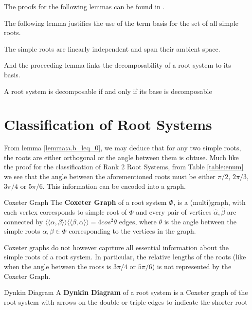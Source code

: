 The proofs for the following lemmas can be found in \cite{humphreys_1972_Weyl}.

The following lemma justifies the use of the term basis for the set of all simple roots.
\begin{lemma}
    \label{lemma:admit_config}
    The simple roots are linearly independent and span their ambient space.
\end{lemma}

And the proceeding lemma links the decomposability of a root system to its basis.
\begin{lemma}
    \label{lemma:decomp}
    A root system is decomposable if and only if its base is decomposable
\end{lemma}

\section{Classification of Root Systems}

From lemma \ref{lemma:a.b_leq_0}, we may deduce that for any two simple roots, the roots are either
orthogonal or the angle between them is obtuse. Much like the proof for the classification of Rank 2
Root Systems, from Table \ref{table:enum} we see that the angle between the aforementioned roots must
be either $\pi/2$, $2\pi/3$, $3\pi/4$ or $5\pi/6$. This information can be encoded into a graph. \newline

\begin{nameddefinition}{Coxeter Graph}
    The \textbf{Coxeter Graph} of a root system $\Phi$, is a (multi)graph, with each vertex
    corresponds to simple root of $\Phi$ and every pair of vertices $\hat\alpha, \hat\beta$ are
    connected by $\langle \langle \alpha, \beta \rangle \rangle \langle \langle \beta, \alpha \rangle \rangle = 
    4cos^2\theta$ edges, where $\theta$ is the angle between the simple roots $\alpha, \beta \in \Phi$
    corresponding to the vertices in the graph.
\end{nameddefinition}

Coxeter graphs do not however caprture all essential information about the simple roots of a root system.
In particular, the relative lengths of the roots (like when the angle between the roots is $3\pi/4$ or $5\pi/6$)
is not represented by the Coxeter Graph. \newline

\begin{nameddefinition}{Dynkin Diagram}
    A \textbf{Dynkin Diagram} of a root system is a Coxeter graph of the root system with arrows on
    the double or triple edges to indicate the shorter root
\end{nameddefinition}

